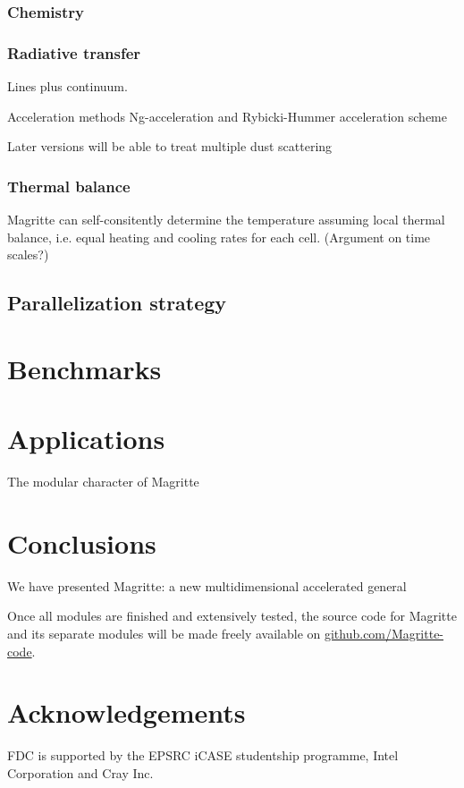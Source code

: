 \documentclass[a4paper,fleqn,usenatbib]{mnras}
\begin{document}
\subsubsection{Chemistry}

\subsubsection{Radiative transfer}

Lines plus continuum.

Acceleration methods Ng-acceleration and Rybicki-Hummer acceleration scheme \citet{Rybicki1991}

Later versions will be able to treat multiple dust scattering

\subsubsection{Thermal balance}

Magritte can self-consitently determine the temperature assuming local thermal balance, i.e. equal heating and cooling rates for each cell. (Argument on time scales?)


\subsection{Parallelization strategy}

\section{Benchmarks}
\label{Benchmarks}

\section{Applications}

The modular character of Magritte


\section{Conclusions}
We have presented Magritte: a new multidimensional accelerated general

\bigskip

Once all modules are finished and extensively tested, the source code for Magritte and its separate modules will be made freely available on \href{https://github.com/Magritte-code}{github.com/Magritte-code}.

\section*{Acknowledgements}

FDC is supported by the EPSRC iCASE studentship programme, Intel Corporation and Cray Inc.








\bsp	%
\label{lastpage}
\end{document}
